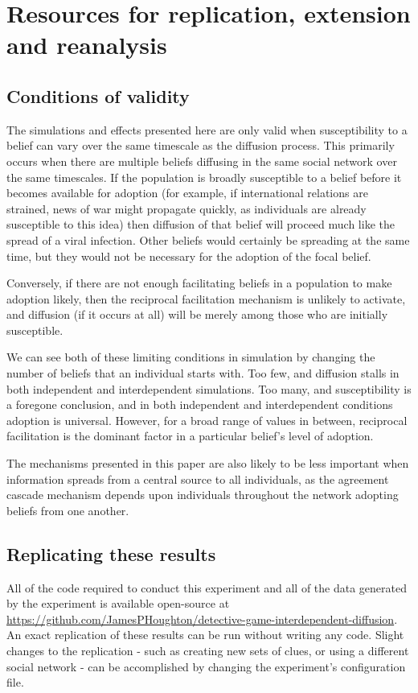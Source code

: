 \documentclass{article}
\begin{document}
\section{Resources for replication, extension and reanalysis}

\subsection{Conditions of validity}
The simulations and effects presented here are only valid when susceptibility to a belief can vary over the same timescale as the diffusion process. This primarily occurs when there are multiple beliefs diffusing in the same social network over the same timescales. If the population is broadly susceptible to a belief before it becomes available for adoption (for example, if international relations are strained, news of war might propagate quickly, as individuals are already susceptible to this idea) then diffusion of that belief will proceed much like the spread of a viral infection. Other beliefs would certainly be spreading at the same time, but they would not be necessary for the adoption of the focal belief. 

Conversely, if there are not enough facilitating beliefs in a population to make adoption likely, then the reciprocal facilitation mechanism is unlikely to activate, and diffusion (if it occurs at all) will be merely among those who are initially susceptible.

We can see both of these limiting conditions in simulation by changing the number of beliefs that an individual starts with. Too few, and diffusion stalls in both independent and interdependent simulations. Too many, and susceptibility is a foregone conclusion, and in both independent and interdependent conditions adoption is universal. However, for a broad range of values in between, reciprocal facilitation is the dominant factor in a particular belief's level of adoption.

The mechanisms presented in this paper are also likely to be less important when information spreads from a central source to all individuals, as the agreement cascade mechanism depends upon individuals throughout the network adopting beliefs from one another.

\subsection{Replicating these results}

All of the code required to conduct this experiment and all of the data generated by the experiment is available open-source at \url{https://github.com/JamesPHoughton/detective-game-interdependent-diffusion}. An exact replication of these results can be run without writing any code. Slight changes to the replication - such as creating new sets of clues, or using a different social network - can be accomplished by changing the experiment's configuration file. 
\end{document}
